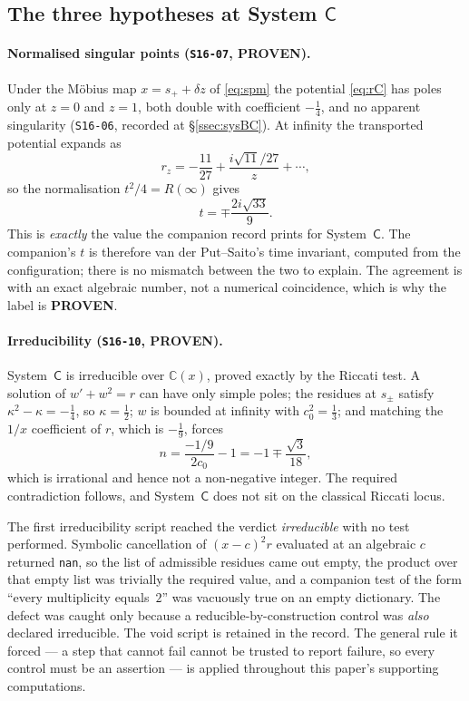 \subsection{The three hypotheses at System \texorpdfstring{$\mathsf
C$}{C}}\label{ssec:hyp-check}

\paragraph{Normalised singular points (\texttt{S16-07}, \textbf{PROVEN}).}
Under the M\"obius map $x=s_++\delta z$ of \eqref{eq:spm} the potential
\eqref{eq:rC} has poles only at $z=0$ and $z=1$, both double with coefficient
$-\tfrac14$, and no apparent singularity (\texttt{S16-06}, recorded at
\S\ref{ssec:sysBC}). At infinity the transported potential expands as
\[
  r_z=-\frac{11}{27}+\frac{i\sqrt{11}/27}{z}+\cdots,
\]
so the normalisation $t^2/4=R(\infty)$ gives
\[
  t=\mp\frac{2i\sqrt{33}}{9}.
\]
This is \emph{exactly} the value the companion record prints for
System~$\mathsf C$. The companion's $t$ is therefore van der Put--Saito's time
invariant, computed from the configuration; there is no mismatch between the
two to explain. The agreement is with an exact algebraic number, not a
numerical coincidence, which is why the label is \textbf{PROVEN}.

\paragraph{Irreducibility (\texttt{S16-10}, \textbf{PROVEN}).}
System~$\mathsf C$ is irreducible over $\mathbb C(x)$, proved exactly by the
Riccati test. A solution of $w'+w^2=r$ can have only simple poles; the residues
at $s_\pm$ satisfy $\kappa^2-\kappa=-\tfrac14$, so $\kappa=\tfrac12$; $w$ is bounded at
infinity with $c_0^2=\tfrac13$; and matching the $1/x$ coefficient of $r$,
which is $-\tfrac19$, forces
\[
  n=\frac{-1/9}{2c_0}-1=-1\mp\frac{\sqrt3}{18},
\]
which is irrational and hence not a non-negative integer. The required
contradiction follows, and System~$\mathsf C$ does not sit on the classical
Riccati locus.

\begin{remark}\label{rem:void}
The first irreducibility script reached the verdict \emph{irreducible} with no
test performed. Symbolic cancellation of $(x-c)^2r$ evaluated at an algebraic
$c$ returned \texttt{nan}, so the list of admissible residues came out empty,
the product over that empty list was trivially the required value, and a
companion test of the form ``every multiplicity equals~$2$'' was vacuously true
on an empty dictionary. The defect was caught only because a
reducible-by-construction control was \emph{also} declared irreducible. The
void script is retained in the record. The general rule it forced --- a step
that cannot fail cannot be trusted to report failure, so every control must be
an assertion --- is applied throughout this paper's supporting computations.
\end{remark}

